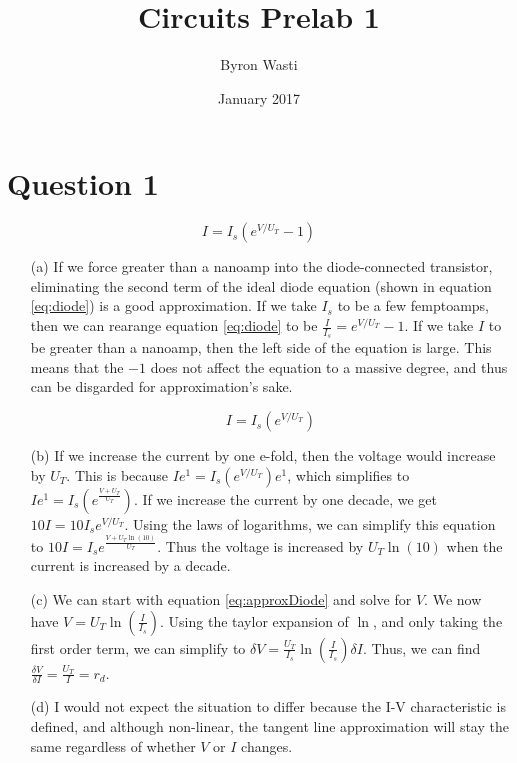 \documentclass{article}
\title{Circuits Prelab 1}
\author{Byron Wasti}
\date{January 2017}
\begin{document}
\maketitle

\section{Question 1}

\begin{equation} \label{eq:diode}
    I = I_s(e^{V/U_T} - 1)
\end{equation}


\begin{itemize}

    \item [(a)] 
        If we force greater than a nanoamp into the diode-connected transistor, eliminating the second term of the ideal diode equation (shown in equation \ref{eq:diode}) is a good approximation. If we take $I_s$ to be a few femptoamps, then we can rearange equation \ref{eq:diode} to be $\frac{I}{I_s} = e^{V/U_T} - 1$. If we take $I$ to be greater than a nanoamp, then the left side of the equation is large. This means that the $-1$ does not affect the equation to a massive degree, and thus can be disgarded for approximation's sake.

\begin{equation} \label{eq:approxDiode}
    I = I_s(e^{V/U_T})
\end{equation}

    \item [(b)] 
        If we increase the current by one e-fold, then the voltage would increase by $U_T$. This is because $Ie^1 = I_s(e^{V/U_T})e^1$, which simplifies to $Ie^1 = I_s( e^{ \frac{V + U_T}{U_T}})$. If we increase the current by one decade, we get $10I = 10I_se^{V/U_T}$. Using the laws of logarithms, we can simplify this equation to $10I = I_se^{\frac{V+U_T\ln{(10)}}{U_T}}$. Thus the voltage is increased by $U_T\ln{(10)}$ when the current is increased by a decade.

    \item [(c)]
        We can start with equation \ref{eq:approxDiode} and solve for $V$. We now have $V = U_T\ln{(\frac{I}{I_s})}$. Using the taylor expansion of $\ln$, and only taking the first order term, we can simplify to $\delta V = \frac{U_T}{I_s}\ln{(\frac{I}{I_s})}\delta I$. Thus, we can find $\frac{ \delta V}{\delta I} = \frac{U_T}{I} = r_d$. 

    \item [(d)]
        I would not expect the situation to differ because the I-V characteristic is defined, and although non-linear, the tangent line approximation will stay the same regardless of whether $V$ or $I$ changes.
        

\end{itemize}
\end{document}
